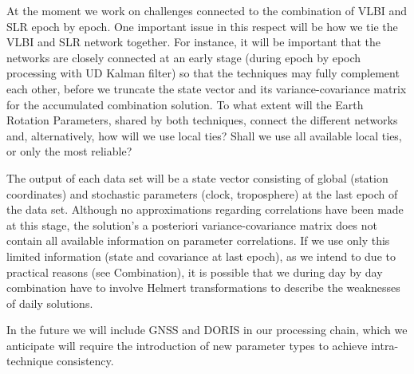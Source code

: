 At the moment we work on challenges connected to the combination of VLBI and SLR epoch by epoch. One important issue in
this respect will be how we tie the VLBI and SLR network together. For instance, it will be important that the networks
are closely connected at an early stage (during epoch by epoch processing with UD Kalman filter) so that the techniques
may fully complement each other, before we truncate the state vector and its variance-covariance matrix for the
accumulated combination solution. To what extent will the Earth Rotation Parameters, shared by both techniques, connect
the different networks and, alternatively, how will we use local ties? Shall we use all available local ties, or only
the most reliable?

The output of each data set will be a state vector consisting of global (station coordinates) and stochastic parameters
(clock, troposphere) at the last epoch of the data set. Although no approximations regarding correlations have been
made at this stage, the solution's a posteriori variance-covariance matrix does not contain all available information
on parameter correlations. If we use only this limited information (state and covariance at last epoch), as we intend
to due to practical reasons (see Combination), it is possible that we during day by day combination have to involve
Helmert transformations to describe the weaknesses of daily solutions.

In the future we will include GNSS and DORIS in our processing chain, which we anticipate will require the introduction
of new parameter types to achieve intra-technique consistency.


\endinput
